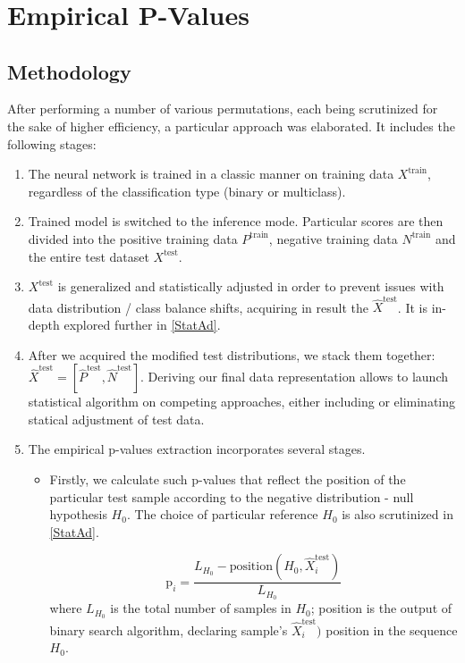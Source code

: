 \documentclass{article}
\begin{document}
\ 

\ 

\ 
 

\section{Empirical P-Values}

\subsection{Methodology}
After performing a number of various permutations, each being scrutinized for the sake of higher efficiency, a particular approach was elaborated. It includes the following stages:


\begin{enumerate}%
    \item The neural network is trained in a classic manner on training data $X^{\text{train}}$, regardless of the classification type (binary or multiclass).
    \item Trained model is switched to the inference mode. Particular scores are then divided into the positive training data $P^{\text{train}}$, negative training data $N^{\text{train}}$ and the entire test dataset $X^{\text{test}}$.
    
    \item $X^{\text{test}}$ is generalized and statistically adjusted in order to prevent issues with data distribution / class balance shifts, acquiring in result the $\hat{X}^{\text{test}}$. It is in-depth explored further in \ref{StatAd}.

    \item  After we acquired the modified test distributions, we stack them together: $\hat{X}^{\text{test}} = [\hat{P}^{\text{test}}, \hat{N}^{\text{test}}]$. Deriving our final data representation allows to launch statistical algorithm on competing approaches, either including or eliminating statical adjustment of test data.

    \item The empirical p-values extraction incorporates several stages. \begin{itemize}
        \item  Firstly, we calculate such p-values that reflect the position of the particular test sample according to the negative distribution - null hypothesis $H_0$. The choice of particular reference $H_0$ is also scrutinized in \ref{StatAd}.

    \begin{equation}
        \text{p}_i = \frac{L_{H_0} - \text{position}(H_0, \hat{X}^{\text{test}}_i)}{L_{H_0}}
    \end{equation}
    where $L_{H_0}$ is the total number of samples in $H_0$; position is the output of binary search algorithm, declaring sample's $\hat{X}^{\text{test}}_i)$ position in the sequence $H_0$. 


\end{itemize}
\end{enumerate}
\end{document}
